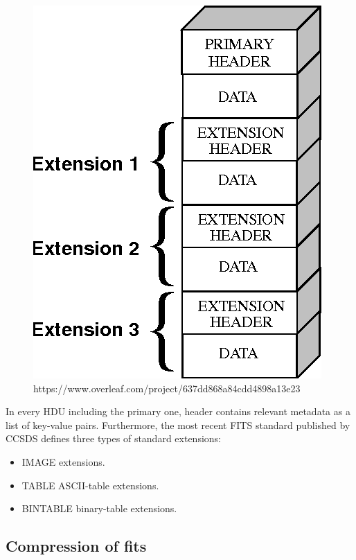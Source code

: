 \documentclass[licencjacka,en]{pracamgr}
\begin{document}
\begin{figure}[h]
\centering
\includegraphics[scale=0.3]{fits}https://www.overleaf.com/project/637dd868a84cdd4898a13e23
\end{figure}

In every HDU including the primary one,  header contains relevant metadata as a list of key-value pairs. \cite{wikipedia} Furthermore, the most recent FITS standard published by CCSDS defines three types of standard extensions:
\begin{itemize}
\item IMAGE extensions.
\item TABLE ASCII-table extensions.
\item BINTABLE binary-table extensions.
\end{itemize}


\subsection{Compression of fits}
\end{document}
